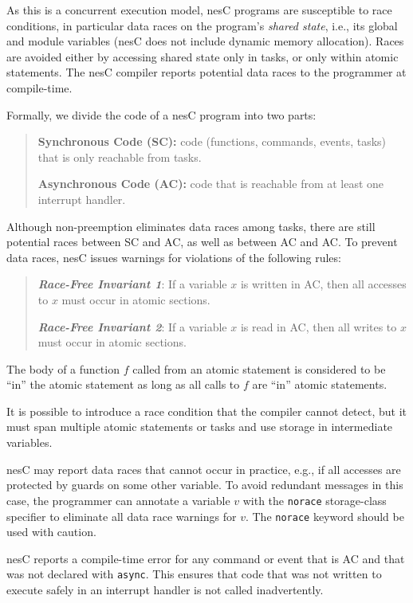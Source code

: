 \documentclass[11pt,letterpaper]{article}
\newcommand{\kw}[1]{{\tt #1}}
\newcommand{\nesc}{nesC\xspace}
\begin{document}
As this is a concurrent execution model, \nesc programs are susceptible to
race conditions, in particular data races on the program's \emph{shared
state}, i.e., its global and module variables (\nesc does not include
dynamic memory allocation). Races are avoided either by accessing
shared state only in tasks, or only within atomic statements. The \nesc
compiler reports potential data races to the programmer at compile-time.

Formally, we divide the code of a \nesc program into two parts:
\begin{quote}
\textbf{Synchronous Code (SC):} code (functions, commands, events, tasks)
that is only reachable from tasks.

\textbf{Asynchronous Code (AC):} code that is reachable from at 
least one interrupt handler.
\end{quote}

Although non-preemption eliminates data races among tasks, there are still
potential races between SC and AC, as well as between AC and AC. To
prevent data races, \nesc issues warnings for violations of the following
rules:
\begin{quote}
{\sl {\bf Race-Free Invariant 1}}: If a variable $x$ is written in AC, then 
all accesses to $x$ must occur in atomic sections.

{\sl {\bf Race-Free Invariant 2}}: If a variable $x$ is read in AC, then 
all writes to $x$ must occur in atomic sections.
\end{quote}
The body of a function $f$ called from an atomic statement is considered to
be ``in'' the atomic statement as long as all calls to $f$ are ``in''
atomic statements.

It is possible to introduce a race condition that the compiler cannot
detect, but it must span multiple atomic statements or tasks and use storage
in intermediate variables.

\nesc may report data races that cannot occur in practice, e.g., if all
accesses are protected by guards on some other variable. To avoid redundant
messages in this case, the programmer can annotate a variable $v$ with the
\kw{norace} storage-class specifier to eliminate all data race warnings for
$v$. The \kw{norace} keyword should be used with caution.

\nesc reports a compile-time error for any command or event that is AC and
that was not declared with \kw{async}. This ensures that code that was not
written to execute safely in an interrupt handler is not called
inadvertently.
\end{document}
